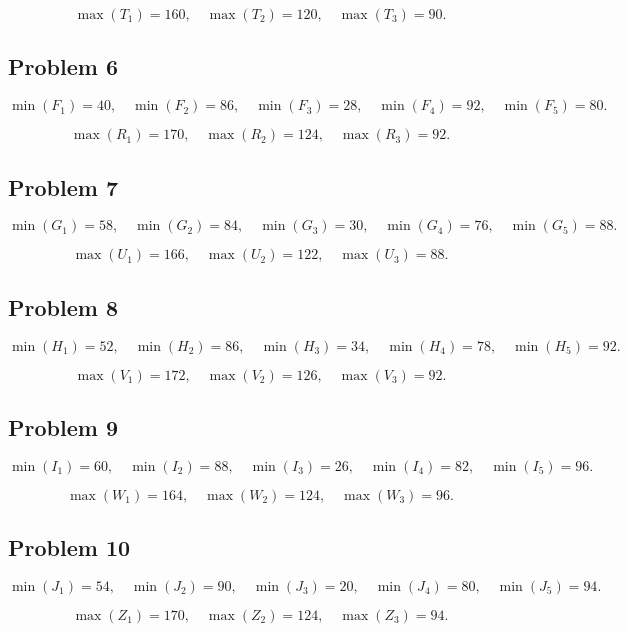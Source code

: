 \[\max(T_1)=160,\quad \max(T_2)=120,\quad \max(T_3)=90.\]

\subsection*{Problem 6}
\[\min(F_1)=40,\quad \min(F_2)=86,\quad \min(F_3)=28,\quad \min(F_4)=92,\quad \min(F_5)=80.\]

\[\max(R_1)=170,\quad \max(R_2)=124,\quad \max(R_3)=92.\]

\subsection*{Problem 7}
\[\min(G_1)=58,\quad \min(G_2)=84,\quad \min(G_3)=30,\quad \min(G_4)=76,\quad \min(G_5)=88.\]

\[\max(U_1)=166,\quad \max(U_2)=122,\quad \max(U_3)=88.\]

\subsection*{Problem 8}
\[\min(H_1)=52,\quad \min(H_2)=86,\quad \min(H_3)=34,\quad \min(H_4)=78,\quad \min(H_5)=92.\]

\[\max(V_1)=172,\quad \max(V_2)=126,\quad \max(V_3)=92.\]

\subsection*{Problem 9}
\[\min(I_1)=60,\quad \min(I_2)=88,\quad \min(I_3)=26,\quad \min(I_4)=82,\quad \min(I_5)=96.\]

\[\max(W_1)=164,\quad \max(W_2)=124,\quad \max(W_3)=96.\]

\subsection*{Problem 10}
\[\min(J_1)=54,\quad \min(J_2)=90,\quad \min(J_3)=20,\quad \min(J_4)=80,\quad \min(J_5)=94.\]

\[\max(Z_1)=170,\quad \max(Z_2)=124,\quad \max(Z_3)=94.\]


